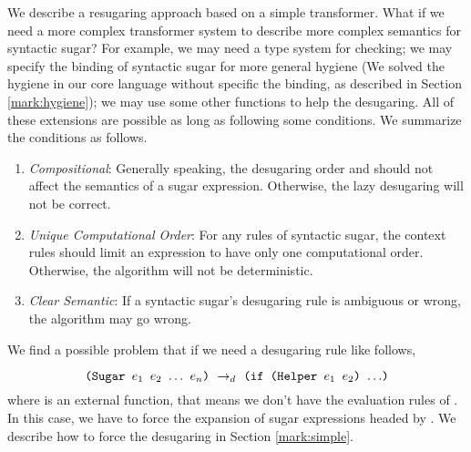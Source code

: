 We describe a resugaring approach based on a simple transformer. What if we need a more complex transformer system to describe more complex semantics for syntactic sugar? For example, we may need a type system for checking; we may specify the binding of syntactic sugar for more general hygiene (We solved the hygiene in our core language without specific the binding, as described in Section \ref{mark:hygiene}); we may use some other functions to help the desugaring. All of these extensions are possible as long as following some conditions. We summarize the conditions as follows.
\begin{enumerate}
	\item \emph{Compositional}: Generally speaking, the desugaring order and should not affect the semantics of a sugar expression. Otherwise, the lazy desugaring will not be correct.
	\item \emph{Unique Computational Order}: For any rules of syntactic sugar, the context rules should limit an expression to have only one computational order. Otherwise, the algorithm  will not be deterministic.
	\item \emph{Clear Semantic}: If a syntactic sugar's desugaring rule is ambiguous or wrong, the algorithm  may go wrong.
\end{enumerate}

We find a possible problem that if we need a desugaring rule like follows,

\[
\texttt{(Sugar $e_1$ $e_2$ $\ldots$ $e_n$)} ~\rightarrow_d~ \texttt{(if (Helper $e_1$ $e_2$) $\ldots$)}
\]
where  is an external function, that means we don't have the evaluation rules of . In this case, we have to force the expansion of sugar expressions headed by . We describe how to force the desugaring in Section \ref{mark:simple}.